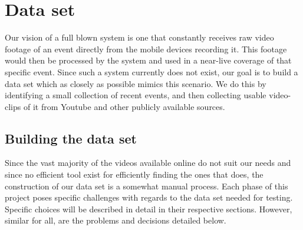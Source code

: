 \documentclass[12pt]{article}
\begin{document}
\section{Data set}
\label{sec:dataset}
%
Our vision of a full blown system is one that constantly receives raw video footage of an event directly from the mobile devices recording it. This footage would then be processed by the system and used in a near-live coverage of that specific event. Since such a system currently does not exist, our goal is to build a data set which as closely as possible mimics this scenario. We do this by identifying a small collection of recent events, and then collecting usable video-clips of it from Youtube and other publicly available sources.
%
\subsection{Building the data set}
%
Since the vast majority of the videos available online do not suit our needs and since no efficient tool exist for efficiently finding the ones that does, the construction of our data set is a somewhat manual process. Each phase of this project poses specific challenges with regards to the data set needed for testing. Specific choices will be described in detail in their respective sections. However, similar for all, are the problems and decisions detailed below.
%
\end{document}
